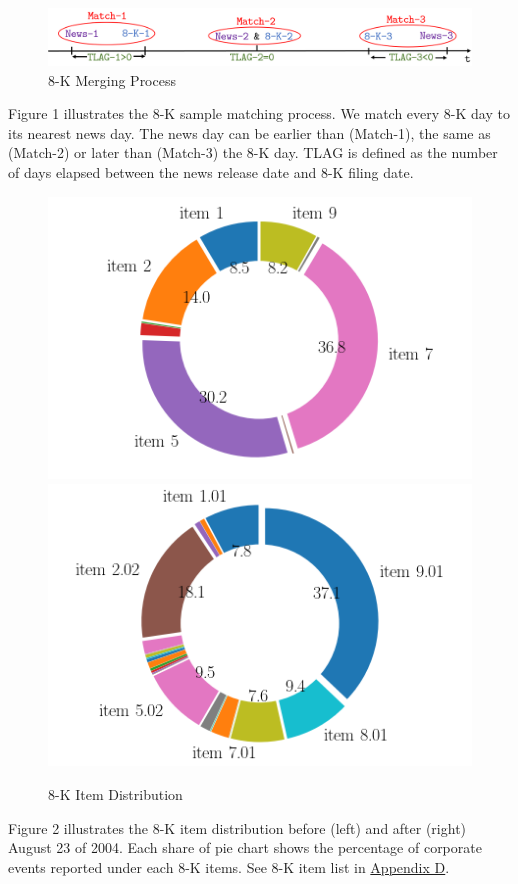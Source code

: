 \begin{figure}
	\caption{8-K Merging Process} \label{fig1}
	\begin{center}
		\includegraphics[scale=0.7]{../output/fig/fig1_matching.png}
	\end{center}
\end{figure}

Figure 1 illustrates the 8-K sample matching process. We match every 8-K day to its nearest news day. The news day can be earlier than (Match-1), the same as (Match-2) or later than (Match-3) the 8-K day. TLAG is defined as the number of days elapsed between the news release date and 8-K filing date.

\begin{figure}[htbp]
	\begin{center}
		\caption{8-K Item Distribution} \label{fig2}
		\includegraphics[scale=0.5]{../output/fig/fig2_8-K_before.png}
		\includegraphics[scale=0.5]{../output/fig/fig2_8-K_after.png}
	\end{center}
\end{figure}

Figure 2 illustrates the 8-K item distribution before (left) and after (right) August 23 of 2004. Each share of pie chart shows the percentage of corporate events reported under each 8-K items. See 8-K item list in \hyperref[appd]{Appendix D}.